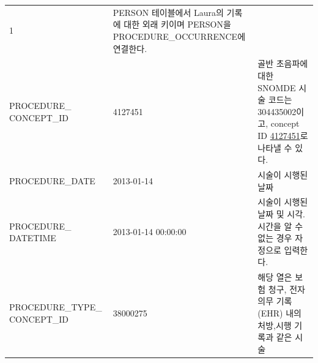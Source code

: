 \documentclass[10.5pt]{book}
\theoremstyle{definition}
\theoremstyle{definition}
\theoremstyle{definition}
\theoremstyle{remark}
\begin{document}
\begin{longtable}[]{@{}lll@{}}
\begin{minipage}[t]{0.16\columnwidth}
1\strut
\end{minipage} & \begin{minipage}[t]{0.48\columnwidth}\raggedright\strut
PERSON 테이블에서 Laura의 기록에 대한 외래 키이며 PERSON을
PROCEDURE\_OCCURRENCE에 연결한다.\strut
\end{minipage}\tabularnewline
\begin{minipage}[t]{0.28\columnwidth}\raggedright\strut
PROCEDURE\_ CONCEPT\_ID\strut
\end{minipage} & \begin{minipage}[t]{0.16\columnwidth}\raggedright\strut
4127451\strut
\end{minipage} & \begin{minipage}[t]{0.48\columnwidth}\raggedright\strut
골반 초음파에 대한 SNOMDE 시술 코드는 304435002이고, concept ID
\href{http://athena.ohdsi.org/search-terms/terms/4127451}{4127451}로
나타낼 수 있다.\strut
\end{minipage}\tabularnewline
\begin{minipage}[t]{0.28\columnwidth}\raggedright\strut
PROCEDURE\_DATE\strut
\end{minipage} & \begin{minipage}[t]{0.16\columnwidth}\raggedright\strut
2013-01-14\strut
\end{minipage} & \begin{minipage}[t]{0.48\columnwidth}\raggedright\strut
시술이 시행된 날짜\strut
\end{minipage}\tabularnewline
\begin{minipage}[t]{0.28\columnwidth}\raggedright\strut
PROCEDURE\_ DATETIME\strut
\end{minipage} & \begin{minipage}[t]{0.16\columnwidth}\raggedright\strut
2013-01-14 00:00:00\strut
\end{minipage} & \begin{minipage}[t]{0.48\columnwidth}\raggedright\strut
시술이 시행된 날짜 및 시각. 시간을 알 수 없는 경우 자정으로
입력한다.\strut
\end{minipage}\tabularnewline
\begin{minipage}[t]{0.28\columnwidth}\raggedright\strut
PROCEDURE\_TYPE\_ CONCEPT\_ID\strut
\end{minipage} & \begin{minipage}[t]{0.16\columnwidth}\raggedright\strut
38000275\strut
\end{minipage} & \begin{minipage}[t]{0.48\columnwidth}\raggedright\strut
해당 열은 보험 청구, 전자 의무 기록(EHR) 내의 처방,시행 기록과 같은 시술

\end{minipage}
\end{longtable}
\end{document}
